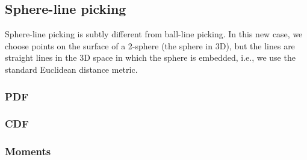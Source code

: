 \subsection{Sphere-line picking}
\label{sec:sphere_line}

Sphere-line picking is subtly different from ball-line picking. In
this new case, we choose points on the surface of a 2-sphere (the
sphere in 3D), but the lines are straight lines in the 3D space in
which the sphere is embedded, i.e., we use the standard Euclidean
distance metric.

\subsubsection{PDF}


\subsubsection{CDF}


\subsubsection{Moments}
